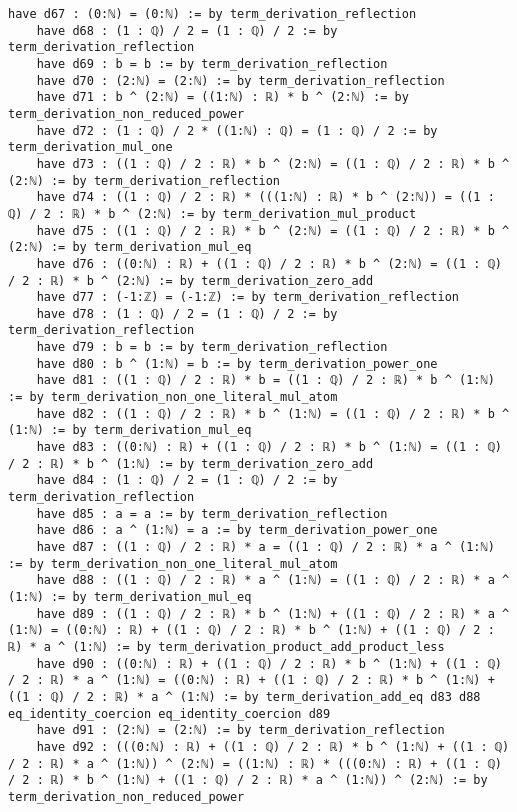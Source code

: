 \documentclass{article}
\begin{document}
\begin{tcolorbox}[colback=white!10, width=\linewidth]
\begin{lstlisting}[language=Lean4]
    have d67 : (0:ℕ) = (0:ℕ) := by term_derivation_reflection
    have d68 : (1 : ℚ) / 2 = (1 : ℚ) / 2 := by term_derivation_reflection
    have d69 : b = b := by term_derivation_reflection
    have d70 : (2:ℕ) = (2:ℕ) := by term_derivation_reflection
    have d71 : b ^ (2:ℕ) = ((1:ℕ) : ℝ) * b ^ (2:ℕ) := by term_derivation_non_reduced_power
    have d72 : (1 : ℚ) / 2 * ((1:ℕ) : ℚ) = (1 : ℚ) / 2 := by term_derivation_mul_one
    have d73 : ((1 : ℚ) / 2 : ℝ) * b ^ (2:ℕ) = ((1 : ℚ) / 2 : ℝ) * b ^ (2:ℕ) := by term_derivation_reflection
    have d74 : ((1 : ℚ) / 2 : ℝ) * (((1:ℕ) : ℝ) * b ^ (2:ℕ)) = ((1 : ℚ) / 2 : ℝ) * b ^ (2:ℕ) := by term_derivation_mul_product
    have d75 : ((1 : ℚ) / 2 : ℝ) * b ^ (2:ℕ) = ((1 : ℚ) / 2 : ℝ) * b ^ (2:ℕ) := by term_derivation_mul_eq
    have d76 : ((0:ℕ) : ℝ) + ((1 : ℚ) / 2 : ℝ) * b ^ (2:ℕ) = ((1 : ℚ) / 2 : ℝ) * b ^ (2:ℕ) := by term_derivation_zero_add
    have d77 : (-1:ℤ) = (-1:ℤ) := by term_derivation_reflection
    have d78 : (1 : ℚ) / 2 = (1 : ℚ) / 2 := by term_derivation_reflection
    have d79 : b = b := by term_derivation_reflection
    have d80 : b ^ (1:ℕ) = b := by term_derivation_power_one
    have d81 : ((1 : ℚ) / 2 : ℝ) * b = ((1 : ℚ) / 2 : ℝ) * b ^ (1:ℕ) := by term_derivation_non_one_literal_mul_atom
    have d82 : ((1 : ℚ) / 2 : ℝ) * b ^ (1:ℕ) = ((1 : ℚ) / 2 : ℝ) * b ^ (1:ℕ) := by term_derivation_mul_eq
    have d83 : ((0:ℕ) : ℝ) + ((1 : ℚ) / 2 : ℝ) * b ^ (1:ℕ) = ((1 : ℚ) / 2 : ℝ) * b ^ (1:ℕ) := by term_derivation_zero_add
    have d84 : (1 : ℚ) / 2 = (1 : ℚ) / 2 := by term_derivation_reflection
    have d85 : a = a := by term_derivation_reflection
    have d86 : a ^ (1:ℕ) = a := by term_derivation_power_one
    have d87 : ((1 : ℚ) / 2 : ℝ) * a = ((1 : ℚ) / 2 : ℝ) * a ^ (1:ℕ) := by term_derivation_non_one_literal_mul_atom
    have d88 : ((1 : ℚ) / 2 : ℝ) * a ^ (1:ℕ) = ((1 : ℚ) / 2 : ℝ) * a ^ (1:ℕ) := by term_derivation_mul_eq
    have d89 : ((1 : ℚ) / 2 : ℝ) * b ^ (1:ℕ) + ((1 : ℚ) / 2 : ℝ) * a ^ (1:ℕ) = ((0:ℕ) : ℝ) + ((1 : ℚ) / 2 : ℝ) * b ^ (1:ℕ) + ((1 : ℚ) / 2 : ℝ) * a ^ (1:ℕ) := by term_derivation_product_add_product_less
    have d90 : ((0:ℕ) : ℝ) + ((1 : ℚ) / 2 : ℝ) * b ^ (1:ℕ) + ((1 : ℚ) / 2 : ℝ) * a ^ (1:ℕ) = ((0:ℕ) : ℝ) + ((1 : ℚ) / 2 : ℝ) * b ^ (1:ℕ) + ((1 : ℚ) / 2 : ℝ) * a ^ (1:ℕ) := by term_derivation_add_eq d83 d88 eq_identity_coercion eq_identity_coercion d89
    have d91 : (2:ℕ) = (2:ℕ) := by term_derivation_reflection
    have d92 : (((0:ℕ) : ℝ) + ((1 : ℚ) / 2 : ℝ) * b ^ (1:ℕ) + ((1 : ℚ) / 2 : ℝ) * a ^ (1:ℕ)) ^ (2:ℕ) = ((1:ℕ) : ℝ) * (((0:ℕ) : ℝ) + ((1 : ℚ) / 2 : ℝ) * b ^ (1:ℕ) + ((1 : ℚ) / 2 : ℝ) * a ^ (1:ℕ)) ^ (2:ℕ) := by term_derivation_non_reduced_power

\end{lstlisting}
\end{tcolorbox}
\end{document}
